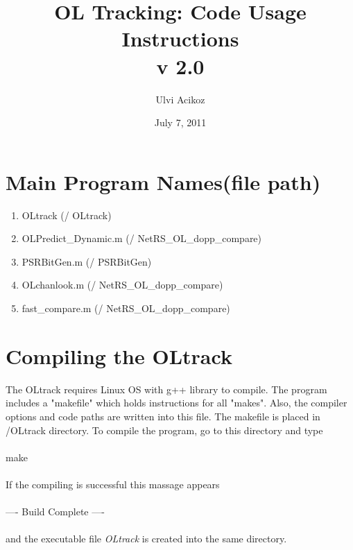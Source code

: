 \documentclass[12pt,letterpaper,oneside]{report}
\begin{document}
\title{OL Tracking: Code Usage Instructions\\v 2.0}
\author{Ulvi Acikoz}
\date{July 7, 2011}
\maketitle
\newpage
{}
\tableofcontents
\newpage
\listoftables
\newpage
{}


\section{Main Program Names(file path)}
\renewcommand\theenumi{\roman{enumi}}
\begin{enumerate}
\item OLtrack (/ OLtrack)
\item OLPredict\_Dynamic.m (/ NetRS\_OL\_dopp\_compare)
\item PSRBitGen.m (/ PSRBitGen)
\item OLchanlook.m (/ NetRS\_OL\_dopp\_compare)
\item fast\_compare.m (/ NetRS\_OL\_dopp\_compare)
\end{enumerate}
\section{Compiling the OLtrack}
{\indent\indent} The OLtrack requires Linux OS with g++ library to compile. The program includes a "makefile" which holds instructions for all "makes".  Also, the compiler options and code paths are written into this file. The makefile is placed in /OLtrack directory. To compile the program, go to this directory and type\\\\
{\selectfont make}\\\\
If the compiling is successful this massage appears\\\\
{\selectfont ---- Build Complete ----}\\\\
and the executable file \emph{OLtrack} is created into the same directory.


\end{document}
